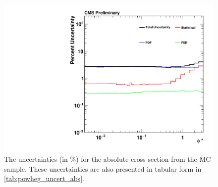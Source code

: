 \begin{figure}[!p]
    \centering
    \includegraphics[width=\textwidth]{figures/powheg_uncertainty_absolute.pdf}
    \caption[
        The uncertainties for the absolute cross section from the \POWHEG MC
        sample.
    ]{
        The uncertainties (in \%) for the absolute cross section from the
        \POWHEG MC sample. These uncertainties are also presented in tabular
        form in \cref{tab:powheg_uncert_abs}.
    }
    \label{fig:powheg_uncert_abs}
\end{figure}
